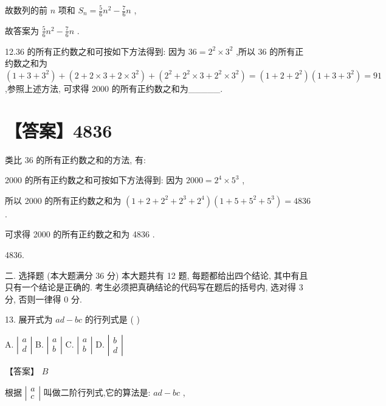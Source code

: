 \documentclass[10pt]{article}
\begin{document}
故数列的前 \(n\) 项和 \({S}_{n} = \frac{5}{6}{n}^{2} - \frac{7}{6}n\) ,

故答案为 \(\frac{5}{6}{n}^{2} - \frac{7}{6}n\) .

12.36 的所有正约数之和可按如下方法得到: 因为 \({36} = {2}^{2} \times  {3}^{2}\) ,所以 36 的所有正约数之和为 \(\left( {1 + 3 + {3}^{2}}\right)  + \left( {2 + 2 \times  3 + 2 \times  {3}^{2}}\right)  + \left( {{2}^{2} + {2}^{2} \times  3 + {2}^{2} \times  {3}^{2}}\right)  = \left( {1 + 2 + {2}^{2}}\right) \left( {1 + 3 + {3}^{2}}\right)  = {91}\) ,参照上述方法, 可求得 2000 的所有正约数之和为\_\_\_\_\_.

\section*{【答案】4836}

类比 36 的所有正约数之和的方法, 有:

2000 的所有正约数之和可按如下方法得到: 因为 \({2000} = {2}^{4} \times  {5}^{3}\) ,

所以 2000 的所有正约数之和为 \(\left( {1 + 2 + {2}^{2} + {2}^{3} + {2}^{4}}\right) \left( {1 + 5 + {5}^{2} + {5}^{3}}\right)  = {4836}\) .

可求得 2000 的所有正约数之和为 4836 .

4836.

二. 选择题 (本大题满分 36 分) 本大题共有 12 题, 每题都给出四个结论, 其中有且只有一个结论是正确的. 考生必须把真确结论的代码写在题后的括号内, 选对得 3 分, 否则一律得 0 分.

13. 展开式为 \({ad} - {bc}\) 的行列式是 ( )

A. \(\left| \begin{array}{l} a \\  d \end{array}\right|\) B. \(\left| \begin{array}{l} a \\  b \end{array}\right|\) C. \(\left| \begin{array}{l} a \\  b \end{array}\right|\) D. \(\left| \begin{array}{l} b \\  d \end{array}\right|\)

【答案】 \(B\)

根据 \(\left| \begin{array}{l} a \\  c \end{array}\right|\) 叫做二阶行列式,它的算法是: \({ad} - {bc}\) ,
\end{document}
